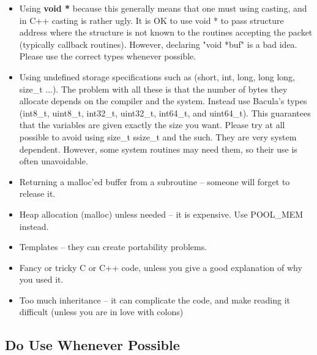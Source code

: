 \begin{itemize}
\item Using {\bf void *} because this generally means that one must
   using casting, and in C++ casting is rather ugly.  It is OK to use
   void * to pass structure address where the structure is not known
   to the routines accepting the packet (typically callback routines).
   However, declaring "void *buf" is a bad idea.  Please use the
   correct types whenever possible.

\item Using undefined storage specifications such as (short, int, long,
   long long, size\_t ...).  The problem with all these is that the number of bytes
   they allocate depends on the compiler and the system.  Instead use
   Bacula's types (int8\_t, uint8\_t, int32\_t, uint32\_t, int64\_t, and
   uint64\_t).  This guarantees that the variables are given exactly the
   size you want. Please try at all possible to avoid using size\_t ssize\_t
   and the such. They are very system dependent.  However, some system
   routines may need them, so their use is often unavoidable.

\item Returning a malloc'ed buffer from a subroutine --  someone will forget
   to release it.

\item Heap allocation (malloc) unless needed -- it is expensive. Use
      POOL\_MEM instead.

\item Templates -- they can create portability problems.

\item Fancy or tricky C or C++ code, unless you give a  good explanation of
   why you used it.

\item Too much inheritance -- it can complicate the code,  and make reading it
   difficult (unless you are in love  with colons)

\end{itemize}

\subsection{Do Use Whenever Possible}

